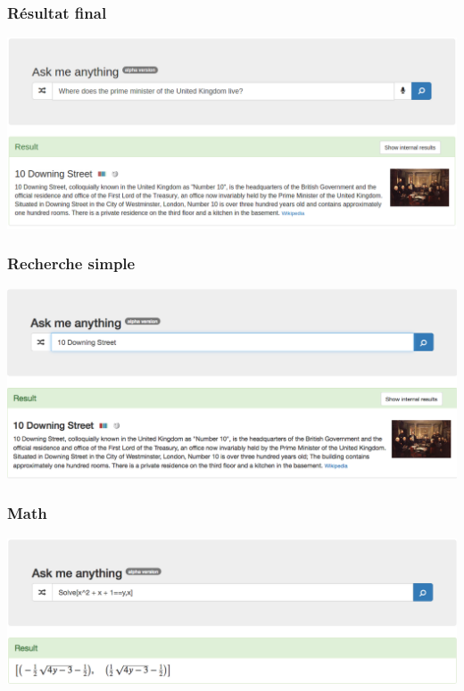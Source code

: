 \begin{frame}
    \frametitle{Résultat final}
    \includegraphics[width=\linewidth]{figures/residence-prime-minister.png}
\end{frame}

\begin{frame}
    \frametitle{Recherche simple}
    \includegraphics[width=\linewidth]{figures/10-downing-street.png}
\end{frame}

\begin{frame}
    \frametitle{Math}
    \includegraphics[width=\linewidth]{figures/math.png}
\end{frame}
